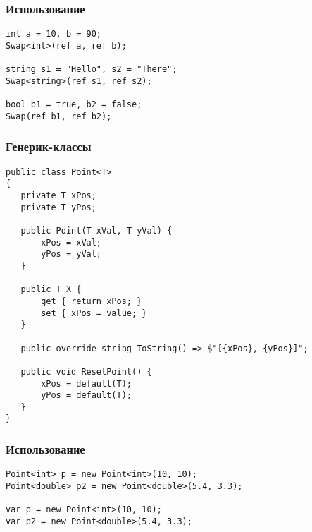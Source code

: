 \documentclass[xetex,mathserif,serif]{beamer}
\begin{document}
	\begin{frame}[fragile]
		\frametitle{Использование}
		\begin{verbatim}
int a = 10, b = 90;
Swap<int>(ref a, ref b);

string s1 = "Hello", s2 = "There";
Swap<string>(ref s1, ref s2);

bool b1 = true, b2 = false;
Swap(ref b1, ref b2);
		\end{verbatim}
	\end{frame}

	\begin{frame}[fragile]
		\frametitle{Генерик-классы}
		\begin{scriptsize}
			\begin{verbatim}
public class Point<T>
{
   private T xPos;
   private T yPos;

   public Point(T xVal, T yVal) {
       xPos = xVal;
       yPos = yVal;
   }
   
   public T X {
       get { return xPos; }
       set { xPos = value; }
   }

   public override string ToString() => $"[{xPos}, {yPos}]";

   public void ResetPoint() {
       xPos = default(T);
       yPos = default(T);
   }
}
			\end{verbatim}
		\end{scriptsize}
	\end{frame}

	\begin{frame}[fragile]
		\frametitle{Использование}
		\begin{verbatim}
Point<int> p = new Point<int>(10, 10);
Point<double> p2 = new Point<double>(5.4, 3.3);

var p = new Point<int>(10, 10);
var p2 = new Point<double>(5.4, 3.3);
		\end{verbatim}
	\end{frame}
\end{document}
